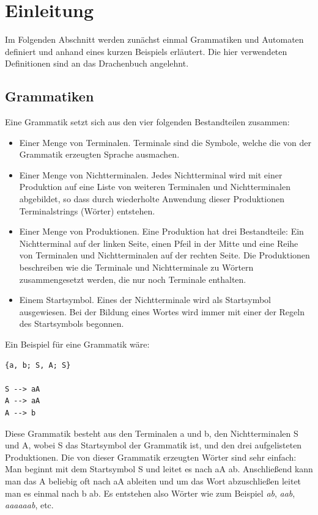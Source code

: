 \section{Einleitung}\raggedbottom
\label{sec:1}
Im Folgenden Abschnitt werden zunächst einmal Grammatiken und Automaten definiert und anhand eines kurzen Beispiels erläutert. Die hier verwendeten Definitionen sind an das Drachenbuch\cite{DraBu} angelehnt.
\subsection{Grammatiken}
\label{sec:1.1}
Eine Grammatik setzt sich aus den vier folgenden Bestandteilen zusammen:
\begin{itemize}
	\item Einer Menge von Terminalen. Terminale sind die Symbole, welche die von der Grammatik erzeugten Sprache ausmachen.
	\item Einer Menge von Nichtterminalen. Jedes Nichtterminal wird mit einer Produktion auf eine Liste von weiteren Terminalen und Nichtterminalen abgebildet, so dass durch wiederholte Anwendung dieser Produktionen Terminalstrings (Wörter) entstehen.
	\item Einer Menge von Produktionen. Eine Produktion hat drei Bestandteile: Ein Nichtterminal auf der linken Seite, einen Pfeil in der Mitte und eine Reihe von Terminalen und Nichtterminalen auf der rechten Seite. Die Produktionen beschreiben wie die Terminale und Nichtterminale zu Wörtern zusammengesetzt werden, die nur noch Terminale enthalten.
	\item Einem Startsymbol. Eines der Nichtterminale wird als Startsymbol ausgewiesen. Bei der Bildung eines Wortes wird immer mit einer der Regeln des Startsymbols begonnen.
\end{itemize}
Ein Beispiel für eine Grammatik wäre:
\lstset{
	captionpos=b,
	breaklines=true,
}
\begin{lstlisting}[frame=single, caption=Beispiel für eine Grammatik]
{a, b; S, A; S}

S --> aA
A --> aA
A --> b
\end{lstlisting}
Diese Grammatik besteht aus den Terminalen a und b, den Nichtterminalen S und A, wobei S das Startsymbol der Grammatik ist, und den drei aufgelisteten Produktionen. Die von dieser Grammatik erzeugten Wörter sind sehr einfach:\\
Man beginnt mit dem Startsymbol S und leitet es nach aA ab. Anschließend kann man das A beliebig oft nach aA ableiten und um das Wort abzuschließen leitet man es einmal nach b ab. Es entstehen also Wörter wie zum Beispiel \textit{ab}, \textit{aab}, \textit{aaaaaab}, etc.
